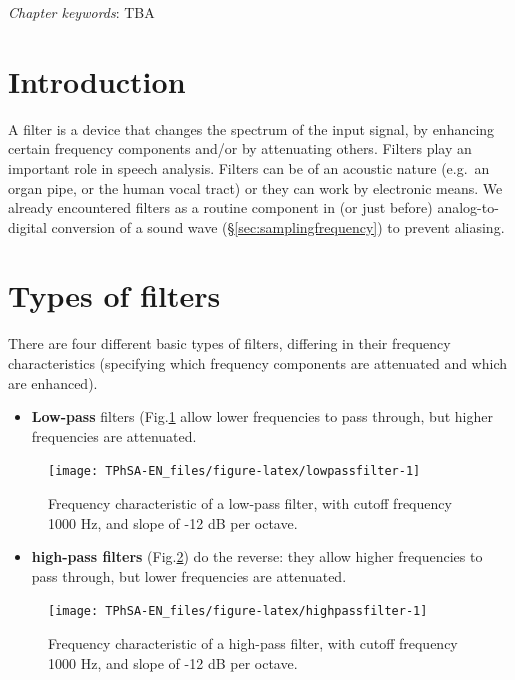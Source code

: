 \documentclass[
]{book}
\providecommand{\tightlist}{%
  \setlength{\itemsep}{0pt}\setlength{\parskip}{0pt}}
\begin{document}
\emph{Chapter keywords}: TBA

\section{Introduction}\label{introduction}

A filter is a device that changes the spectrum of the input signal, by enhancing certain frequency components and/or by attenuating others. Filters play an important role in speech analysis. Filters can be of an acoustic nature (e.g.~an organ pipe, or the human vocal tract) or they can work by electronic means. We already encountered filters as a routine component in (or just before) analog-to-digital conversion of a sound wave (§\ref{sec:samplingfrequency}) to prevent aliasing.

\section{Types of filters}\label{sec:typesoffilters}

There are four different basic types of filters, differing in their frequency characteristics (specifying which frequency components are attenuated and which are enhanced).

\begin{itemize}
\tightlist
\item
  \textbf{Low-pass} filters (Fig.\ref{fig:lowpassfilter} allow lower frequencies to pass through, but higher frequencies are attenuated.
\end{itemize}

\begin{figure}

{\centering \texttt{[image: TPhSA-EN\_files/figure-latex/lowpassfilter-1]} 

}

\caption{Frequency characteristic of a low-pass filter, with cutoff frequency 1000 Hz, and slope of -12 dB per octave.}\label{fig:lowpassfilter}
\end{figure}

\begin{itemize}
\tightlist
\item
  \textbf{high-pass filters} (Fig.\ref{fig:highpassfilter}) do the reverse: they allow higher frequencies to pass through, but lower frequencies are attenuated.
\end{itemize}

\begin{figure}

{\centering \texttt{[image: TPhSA-EN\_files/figure-latex/highpassfilter-1]} 

}

\caption{Frequency characteristic of a high-pass filter, with cutoff frequency 1000 Hz, and slope of -12 dB per octave.}\label{fig:highpassfilter}
\end{figure}
\end{document}

